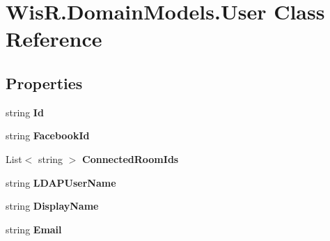 \hypertarget{class_wis_r_1_1_domain_models_1_1_user}{}\section{Wis\+R.\+Domain\+Models.\+User Class Reference}
\label{class_wis_r_1_1_domain_models_1_1_user}
\subsection*{Properties}
\begin{DoxyCompactItemize}
\item 
\hypertarget{class_wis_r_1_1_domain_models_1_1_user_abd48a0c4f779bb741899827c5604dc42}{}string {\bfseries Id}\label{class_wis_r_1_1_domain_models_1_1_user_abd48a0c4f779bb741899827c5604dc42}

\item 
\hypertarget{class_wis_r_1_1_domain_models_1_1_user_a16ba867b98da626e679c2476e24dce43}{}string {\bfseries Facebook\+Id}\label{class_wis_r_1_1_domain_models_1_1_user_a16ba867b98da626e679c2476e24dce43}

\item 
\hypertarget{class_wis_r_1_1_domain_models_1_1_user_ae52509181ea6e13c85bb17170ae1b0f4}{}List$<$ string $>$ {\bfseries Connected\+Room\+Ids}\label{class_wis_r_1_1_domain_models_1_1_user_ae52509181ea6e13c85bb17170ae1b0f4}

\item 
\hypertarget{class_wis_r_1_1_domain_models_1_1_user_abf5bbdce1721800c9f285155be0ef52d}{}string {\bfseries L\+D\+A\+P\+User\+Name}\label{class_wis_r_1_1_domain_models_1_1_user_abf5bbdce1721800c9f285155be0ef52d}

\item 
\hypertarget{class_wis_r_1_1_domain_models_1_1_user_a0f4caaa37a15a2825478d3863e70ebb3}{}string {\bfseries Display\+Name}\label{class_wis_r_1_1_domain_models_1_1_user_a0f4caaa37a15a2825478d3863e70ebb3}

\item 
\hypertarget{class_wis_r_1_1_domain_models_1_1_user_ae2784c60265bb7060ea18fcc4314cb89}{}string {\bfseries Email}\label{class_wis_r_1_1_domain_models_1_1_user_ae2784c60265bb7060ea18fcc4314cb89}


\end{DoxyCompactItemize}
